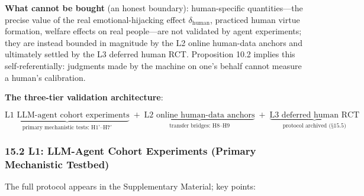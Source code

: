 \documentclass[
  11pt]{article}
\begin{document}
\textbf{What cannot be bought} (an honest boundary): human-specific
quantities---the precise value of the real emotional-hijacking effect
\(\delta_{\mathrm{human}}\), practiced human virtue formation, welfare
effects on real people---are not validated by agent experiments; they
are instead bounded in magnitude by the L2 online human-data anchors and
ultimately settled by the L3 deferred human RCT. Proposition 10.2
implies this self-referentially: judgments made by the machine on one's
behalf cannot measure a human's calibration.

\textbf{The three-tier validation architecture}:

\[\underbrace{\text{L1 LLM-agent cohort experiments}}_{\text{primary mechanistic tests: H1'–H7'}} \;+\; \underbrace{\text{L2 online human-data anchors}}_{\text{transfer bridges: H8–H9}} \;+\; \underbrace{\text{L3 deferred human RCT}}_{\text{protocol archived (§15.5)}}\]

\subsubsection{15.2 L1: LLM-Agent Cohort Experiments (Primary
Mechanistic
Testbed)}\label{l1-llm-agent-cohort-experiments-primary-mechanistic-testbed}

The full protocol appears in the Supplementary Material; key points:
\end{document}
